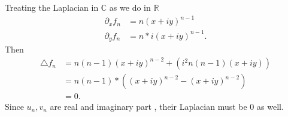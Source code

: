 \begin{solution}
  Treating the Laplacian in $\mathbb{C}$ as we do in $\mathbb{R}$ 
  \begin{align*}
    \partial_x f_n  &= n(x+iy)^{n-1} \\
    \partial_y f_n  &= n*i(x+iy)^{n-1} 
  .\end{align*}
  Then 
  \begin{align*}
    \triangle f_n &= n(n-1)(x+iy)^{n-2}  +(i^2n(n-1)(x+iy)) \\
    &= n(n-1)*\left( (x+iy)^{n-2} - (x+iy)^{n-2}   \right)  \\
    &= 0
  .\end{align*}
  Since $u_n,v_n$ are real and imaginary part , their Laplacian must be 0 as well.

\end{solution}
